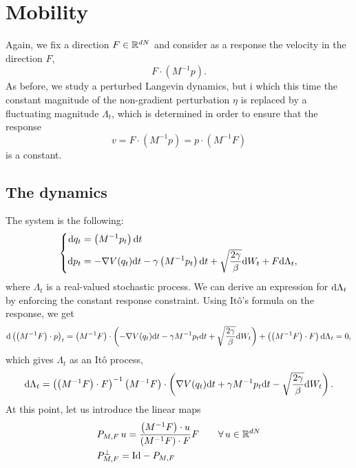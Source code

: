 \section{Mobility}
Again, we fix a direction $F\in \mathbb{R}^{dN}$ and consider as a response the velocity in the direction $F$, \[F\cdot \left(M^{-1} p\right).\]
As before, we study a perturbed Langevin dynamics, but i which this time the constant magnitude of the non-gradient perturbation $\eta$ is replaced by a fluctuating magnitude $\Lambda_t$, which is determined in order to ensure that the response
\[v=F\cdot\left(M^{-1}p\right)=p\cdot\left(M^{-1}F\right)\]
is a constant.

\subsection{The dynamics}
The system is the following:
\begin{equation}
    \label{eq:norton_method}
    \left\{\begin{aligned}
        \mathrm{d} q_t&=\left(M^{-1}p_t\right)\mathrm{d} t\\
        \mathrm{d} p_t&=-\nabla V(q_t)\mathrm{d} t -\gamma\left(M^{-1}p_t\right)\mathrm{d} t+\sqrt{\frac{2\gamma}\beta}\mathrm{d} W_t+F\mathrm{d} \Lambda_t,
    \end{aligned}\right.
\end{equation}
where $\Lambda_t$ is a real-valued stochastic process. We can derive an expression for $\mathrm{d} \Lambda_t$ by enforcing the constant response constraint.
Using Itô's formula on the response, we get
\begin{equation}
    \label{eq:formula_response}
\mathrm{d} \left(\left(M^{-1}F\right)\cdot p\right)_t=\left(M^{-1}F\right)\cdot\left(-\nabla V(q_t)\mathrm{d} t -\gamma M^{-1}p_t\mathrm{d} t+\sqrt{\frac{2\gamma}\beta}\mathrm{d} W_t\right)+\left( \left(M^{-1}F\right)\cdot F\right)\mathrm{d}\Lambda_t=0,
\end{equation}
which gives $\Lambda_t$ as an Itô process,
\begin{equation}
    \label{eq:norton_multiplier_ito_decomposition}
    \mathrm{d} \Lambda_t=\left( \left(M^{-1}F\right)\cdot F\right)^{-1}\left(M^{-1}F\right)\cdot\left(\nabla V(q_t)\mathrm{d} t +\gamma M^{-1}p_t\mathrm{d} t-\sqrt{\frac{2\gamma}\beta}\mathrm{d} W_t\right).
\end{equation}
At this point, let us introduce the linear maps
\begin{equation}
    \label{eq:norton_projector}
    \begin{aligned}
        &P_{M,F}\,u=\frac{\left(M^{-1}F\right)\cdot u}{\left(M^{-1}F\right)\cdot F}F\qquad\forall\,u\in\mathbb{R}^{dN}\\
        &P_{M,F}^\perp=\mathrm{Id}-P_{M,F}
    \end{aligned}
\end{equation}
